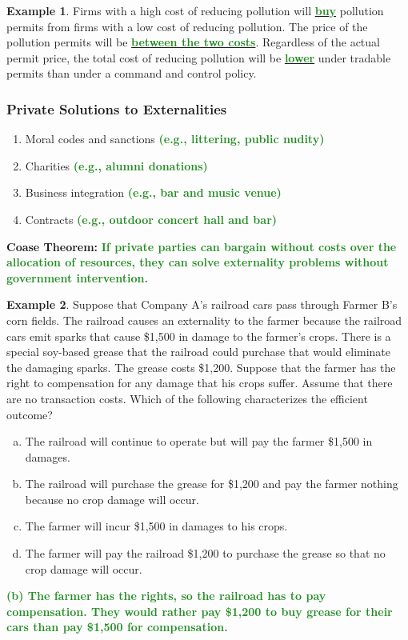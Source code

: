 \documentclass[11pt]{article}\usepackage[]{graphicx}\usepackage[]{color}
\theoremstyle{definition}
\newtheorem{exmp}{Example}[section]
\newcommand{\ddp}[1]{{\textbf{\textcolor{ForestGreen}{#1}}}}
\newcommand{\dd}[1]{{\underline{\textbf{\textcolor{ForestGreen}{#1}}}}}
\newcommand{\defn}[1]{\textbf{#1}}
\begin{document}
\begin{exmp}
	Firms with a high cost of reducing pollution will \dd{buy} pollution permits from firms with a low cost of reducing pollution. The price of the pollution permits will be \dd{between the two costs}. Regardless of the actual permit price, the total cost of reducing pollution will be \dd{lower} under tradable permits than under a command and control policy.
	
	\end{exmp}
	
	\subsubsection*{Private Solutions to Externalities}
	
	\begin{enumerate}
		\item Moral codes and sanctions \ddp{(e.g., littering, public nudity)}
		\item Charities \ddp{(e.g., alumni donations)}
		\item Business integration \ddp{(e.g., bar and music venue)}
		\item Contracts \ddp{(e.g., outdoor concert hall and bar)}
	\end{enumerate}
	
	\defn{Coase Theorem:} \ddp{If private parties can bargain without costs over the allocation of resources, they can solve externality problems without government intervention.}
	
	\begin{exmp}
		Suppose that Company A's railroad cars pass through Farmer B's corn fields. The railroad causes an externality to the farmer because the railroad cars emit sparks that cause \$1,500 in damage to the farmer's crops. There is a special soy-based grease that the railroad could purchase that would eliminate the damaging sparks. The grease costs \$1,200. Suppose that the farmer has the right to compensation for any damage that his crops suffer. Assume that there are no transaction costs. Which of the following characterizes the efficient outcome?
		
		\begin{enumerate}[(a)]
			\item The railroad will continue to operate but will pay the farmer \$1,500 in damages.
			\item The railroad will purchase the grease for \$1,200 and pay the farmer nothing because no crop damage will occur.
			\item The farmer will incur \$1,500 in damages to his crops.
			\item The farmer will pay the railroad \$1,200 to purchase the grease so that no crop damage
			will occur.
		\end{enumerate}
	\end{exmp} 
	\ddp{(b) The farmer has the rights, so the railroad has to pay compensation. They would rather pay \$1,200 to buy grease for their cars than pay \$1,500 for compensation.\\}
	
\end{document}
